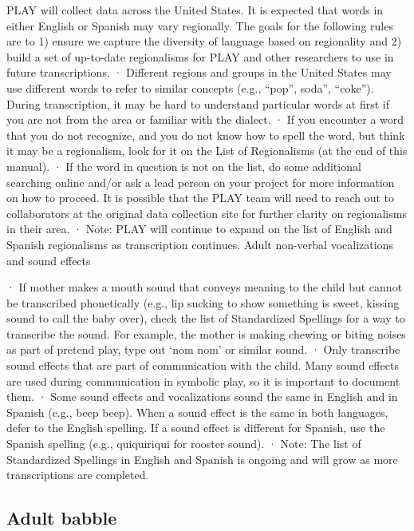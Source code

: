 \documentclass[
  12pt,
]{book}
\begin{document}
PLAY will collect data across the United States. It is expected that words in either English or Spanish may vary regionally. The goals for the following rules are to 1) ensure we capture the diversity of language based on regionality and 2) build a set of up-to-date regionalisms for PLAY and other researchers to use in future transcriptions.
· Different regions and groups in the United States may use different words to refer to similar concepts (e.g., ``pop'', soda'', ``coke''). During transcription, it may be hard to understand particular words at first if you are not from the area or familiar with the dialect.
· If you encounter a word that you do not recognize, and you do not know how to spell the word, but think it may be a regionalism, look for it on the List of Regionalisms (at the end of this manual).
· If the word in question is not on the list, do some additional searching online and/or ask a lead person on your project for more information on how to proceed. It is possible that the PLAY team will need to reach out to collaborators at the original data collection site for further clarity on regionalisms in their area.
· Note: PLAY will continue to expand on the list of English and Spanish regionalisms as transcription continues.
Adult non-verbal vocalizations and sound effects

· If mother makes a mouth sound that conveys meaning to the child but cannot be transcribed phonetically (e.g., lip sucking to show something is sweet, kissing sound to call the baby over), check the list of Standardized Spellings for a way to transcribe the sound. For example, the mother is making chewing or biting noises as part of pretend play, type out `nom nom' or similar sound.
· Only transcribe sound effects that are part of communication with the child. Many sound effects are used during communication in symbolic play, so it is important to document them.
· Some sound effects and vocalizations sound the same in English and in Spanish (e.g., beep beep). When a sound effect is the same in both languages, defer to the English spelling. If a sound effect is different for Spanish, use the Spanish spelling (e.g., quiquiriqui for rooster sound).
· Note: The list of Standardized Spellings in English and Spanish is ongoing and will grow as more transcriptions are completed.

\hypertarget{adult-babble}{%
\subsection{Adult babble}\label{adult-babble}}
\end{document}
